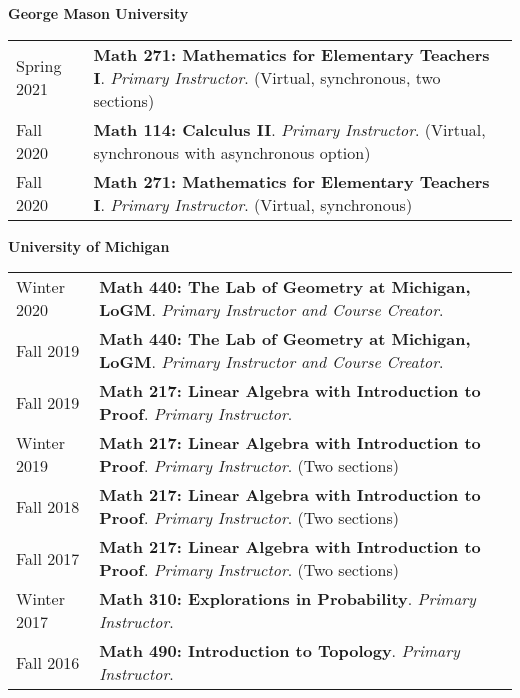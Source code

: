 
    \medskip


    \medskip
    \medskip



    \textbf{\large George Mason University}
    
    \begin{center}
    {
    \renewcommand{\arraystretch}{1.2}
    \begin{longtable}{p{}  p{}}
      Spring 2021 & \textbf{{\normalfont Math 271:} Mathematics for Elementary Teachers I}. \textit{Primary Instructor}. (Virtual, synchronous, two sections) \\ 
  Fall 2020 & \textbf{{\normalfont Math 114:} Calculus II}. \textit{Primary Instructor}. (Virtual, synchronous with asynchronous option) \\ 
  Fall 2020 & \textbf{{\normalfont Math 271:} Mathematics for Elementary Teachers I}. \textit{Primary Instructor}. (Virtual, synchronous) 
    \end{longtable}
    } 
    \end{center}

    \vspace{-1em}
    

    \textbf{\large University of Michigan}
    
    \begin{center}
    {
    \renewcommand{\arraystretch}{1.2}
    \begin{longtable}{p{}  p{}}
      Winter 2020 & \textbf{{\normalfont Math 440:} The Lab of Geometry at Michigan, LoGM}. \textit{Primary Instructor and Course Creator}.  \\ 
  Fall 2019 & \textbf{{\normalfont Math 440:} The Lab of Geometry at Michigan, LoGM}. \textit{Primary Instructor and Course Creator}.  \\ 
  Fall 2019 & \textbf{{\normalfont Math 217:} Linear Algebra with Introduction to Proof}. \textit{Primary Instructor}.  \\ 
  Winter 2019 & \textbf{{\normalfont Math 217:} Linear Algebra with Introduction to Proof}. \textit{Primary Instructor}. (Two sections) \\ 
  Fall 2018 & \textbf{{\normalfont Math 217:} Linear Algebra with Introduction to Proof}. \textit{Primary Instructor}. (Two sections) \\ 
  Fall 2017 & \textbf{{\normalfont Math 217:} Linear Algebra with Introduction to Proof}. \textit{Primary Instructor}. (Two sections) \\ 
  Winter 2017 & \textbf{{\normalfont Math 310:} Explorations in Probability}. \textit{Primary Instructor}.  \\ 
  Fall 2016 & \textbf{{\normalfont Math 490:} Introduction to Topology}. \textit{Primary Instructor}.  
    \end{longtable}
    } 
    \end{center}

